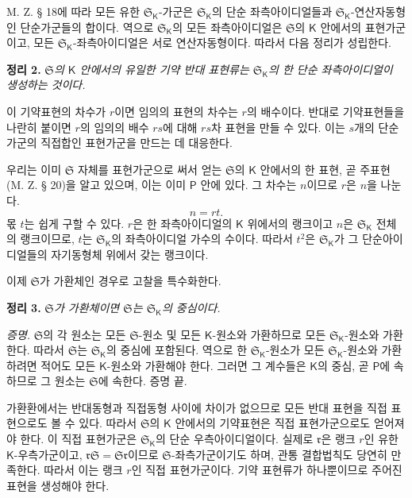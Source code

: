 M. Z. § 18에 따라 모든 유한 \(\mathfrak S_{\mathsf K}\)-가군은 \(\mathfrak S_{\mathsf K}\)의 단순 좌측아이디얼들과 \(\mathfrak S_{\mathsf K}\)-연산자동형인 단순가군들의 합이다. 역으로 \(\mathfrak S_{\mathsf K}\)의 모든 좌측아이디얼은 \(\mathfrak S\)의 \(\mathsf K\) 안에서의 표현가군이고, 모든 \(\mathfrak S_{\mathsf K}\)-좌측아이디얼은 서로 연산자동형이다. 따라서 다음 정리가 성립한다.

\textbf{정리 2.} \emph{\(\mathfrak S\)의 \(\mathsf K\) 안에서의 유일한 기약 반대 표현류는 \(\mathfrak S_{\mathsf K}\)의 한 단순 좌측아이디얼이 생성하는 것이다.}

이 기약표현의 차수가 \(r\)이면 임의의 표현의 차수는 \(r\)의 배수이다. 반대로 기약표현들을 나란히 붙이면 \(r\)의 임의의 배수 \(rs\)에 대해 \(rs\)차 표현을 만들 수 있다. 이는 \(s\)개의 단순가군의 직접합인 표현가군을 만드는 데 대응한다.

우리는 이미 \(\mathfrak S\) 자체를 표현가군으로 써서 얻는 \(\mathfrak S\)의 \(\mathsf K\) 안에서의 한 표현, 곧 주표현(M. Z. § 20)을 알고 있으며, 이는 이미 \(\mathsf P\) 안에 있다. 그 차수는 \(n\)이므로 \(r\)은 \(n\)을 나눈다.
\[
        n=rt.
\]
몫 \(t\)는 쉽게 구할 수 있다. \(r\)은 한 좌측아이디얼의 \(\mathsf K\) 위에서의 랭크이고 \(n\)은 \(\mathfrak S_{\mathsf K}\) 전체의 랭크이므로, \(t\)는 \(\mathfrak S_{\mathsf K}\)의 좌측아이디얼 가수의 수이다. 따라서 \(t^2\)은 \(\mathfrak S_{\mathsf K}\)가 그 단순아이디얼들의 자기동형체 위에서 갖는 랭크이다.

이제 \(\mathfrak S\)가 가환체인 경우로 고찰을 특수화한다.

\textbf{정리 3.} \emph{\(\mathfrak S\)가 가환체이면 \(\mathfrak S\)는 \(\mathfrak S_{\mathsf K}\)의 중심이다.}

\emph{증명.} \(\mathfrak S\)의 각 원소는 모든 \(\mathfrak S\)-원소 및 모든 \(\mathsf K\)-원소와 가환하므로 모든 \(\mathfrak S_{\mathsf K}\)-원소와 가환한다. 따라서 \(\mathfrak S\)는 \(\mathfrak S_{\mathsf K}\)의 중심에 포함된다. 역으로 한 \(\mathfrak S_{\mathsf K}\)-원소가 모든 \(\mathfrak S_{\mathsf K}\)-원소와 가환하려면 적어도 모든 \(\mathsf K\)-원소와 가환해야 한다. 그러면 그 계수들은 \(\mathsf K\)의 중심, 곧 \(\mathsf P\)에 속하므로 그 원소는 \(\mathfrak S\)에 속한다. 증명 끝.

가환환에서는 반대동형과 직접동형 사이에 차이가 없으므로 모든 반대 표현을 직접 표현으로도 볼 수 있다. 따라서 \(\mathfrak S\)의 \(\mathsf K\) 안에서의 기약표현은 직접 표현가군으로도 얻어져야 한다. 이 직접 표현가군은 \(\mathfrak S_{\mathsf K}\)의 단순 우측아이디얼이다. 실제로 \(\mathfrak r\)은 랭크 \(r\)인 유한 \(\mathsf K\)-우측가군이고, \(\mathfrak r\mathfrak S=\mathfrak S\mathfrak r\)이므로 \(\mathfrak S\)-좌측가군이기도 하며, 관통 결합법칙도 당연히 만족한다. 따라서 이는 랭크 \(r\)인 직접 표현가군이다. 기약 표현류가 하나뿐이므로 주어진 표현을 생성해야 한다.

